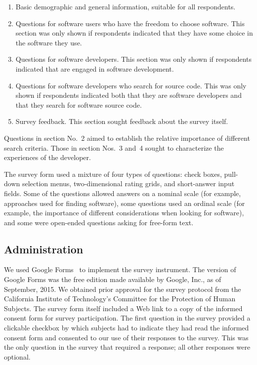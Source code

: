 \documentclass{casicswhitepaper}
\begin{document}
\begin{enumerate}

\item Basic demographic and general information, suitable for all respondents.

\item Questions for software users who have the freedom to choose software.  This section was only shown if respondents indicated that they have some choice in the software they use.

\item Questions for software developers.  This section was only shown if respondents indicated that are engaged in software development.

\item Questions for software developers who search for source code.  This was only shown if respondents indicated both that they are software developers and that they search for software source code.

\item Survey feedback.  This section sought feedback about the survey itself.

\end{enumerate}

Questions in section No.~2 aimed to establish the relative importance of different search criteria.  Those in section Nos.~3 and~4 sought to characterize the experiences of the developer.

The survey form used a mixture of four types of questions: check boxes, pull-down selection menus, two-dimensional rating grids, and short-answer input fields.  Some of the questions allowed answers on a nominal scale (for example, approaches used for finding software), some questions used an ordinal scale (for example, the importance of different considerations when looking for software), and some were open-ended questions asking for free-form text.


\subsection{Administration}

We used Google Forms~\cite{googleforms} to implement the survey instrument.  The version of Google Forms was the free edition made available by Google, Inc., as of September, 2015.  We obtained prior approval for the survey protocol from the California Institute of Technology's Committee for the Protection of Human Subjects.  The survey form itself included a Web link to a copy of the informed consent form for survey participation.  The first question in the survey provided a clickable checkbox by which subjects had to indicate they had read the informed consent form and consented to our use of their responses to the survey.  This was the only question in the survey that required a response; all other responses were optional.
\end{document}
